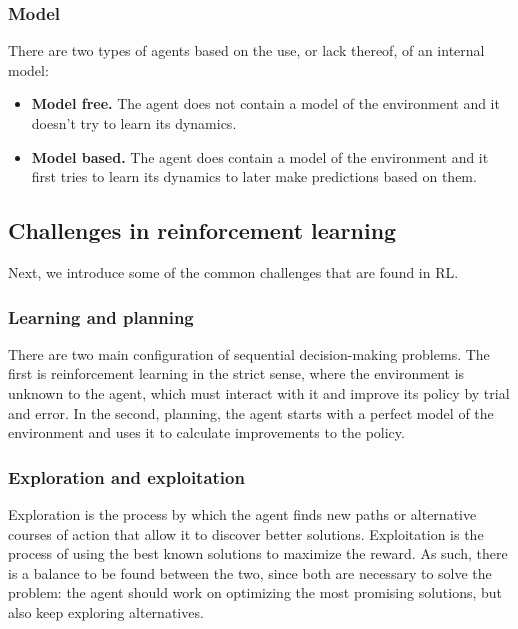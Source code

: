 \subsubsection*{Model}

There are two types of agents based on the use, or lack thereof, of an internal model:

\begin{itemize}
    \item \textbf{Model free.} The agent does not contain a model of the environment and it doesn't try to learn its dynamics.
    \item \textbf{Model based.} The agent does contain a model of the environment and it first tries to learn its dynamics to later make predictions based on them.
\end{itemize}

\subsection{Challenges in reinforcement learning}
\label{sec:challenges}

Next, we introduce some of the common challenges that are found in RL.

\subsubsection*{Learning and planning}

There are two main configuration of sequential decision-making problems. The first is reinforcement learning in the strict sense, where the environment is unknown to the agent, which must interact with it and improve its policy by trial and error. In the second, planning, the agent starts with a perfect model of the environment and uses it to calculate improvements to the policy.


\subsubsection*{Exploration and exploitation}

Exploration is the process by which the agent finds new paths or alternative courses of action that allow it to discover better solutions. Exploitation is the process of using the best known solutions to maximize the reward. As such, there is a balance to be found between the two, since both are necessary to solve the problem: the agent should work on optimizing the most promising solutions, but also keep exploring alternatives.

